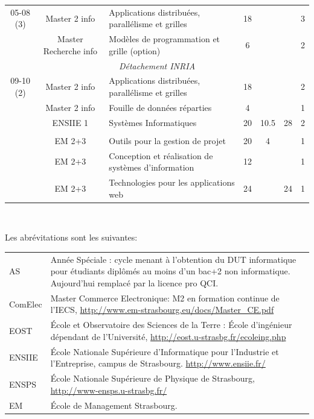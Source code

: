 \documentclass[11pt]{article}
\begin{document}
\begin{center}
{\begin{tabular}{|c|c|p{5cm}|c|c|c|c|}
\hline
05-08 (3)
	& Master 2 info		& Applications distribuées, parallélisme et grilles	&  18	& & & 3 \\
	& Master Recherche info	& Modèles de programmation et grille (option) 		& 6	& & & 2 \\
\hline

\multicolumn{7}{|c|}{\textit{Détachement INRIA}}\\  \hline
09-10 (2)
	& Master 2 info		& Applications distribuées, parallélisme et grilles	&  18	&   &   & 2 \\
	& Master 2 info		& Fouille de données réparties			&  4	&   &   & 1 \\
	& ENSIIE 1		& Systèmes Informatiques				& 20	& 10.5 & 28 & 2 \\ 
&&&&&&\\
	& EM 2+3		& Outils pour la gestion de projet			&  20	& 4 &   & 1 \\
	& EM 2+3		& Conception et réalisation de systèmes d'information	&  12	&   &   & 1 \\
	& EM 2+3		& Technologies pour les applications web		&  24	&   & 24& 1 \\
	
\hline
\end{tabular}\\
}

\end{center}

\noindent
Les abrévitations sont les suivantes:\\

\begin{small}
\begin{tabular}{lp{14cm}}
AS		& Année Spéciale : cycle menant à l'obtention du DUT informatique 
		pour étudiants diplômés au moins d'un bac+2 non informatique. Aujourd'hui remplacé par la licence pro QCI.\\ 
ComElec	& Master Commerce Electronique: M2 en formation continue de l'IECS, \url{http://www.em-strasbourg.eu/docs/Master_CE.pdf}\\
EOST 		& \'Ecole et Observatoire des Sciences de la Terre : \'Ecole d'ingénieur dépendant de l'Université, \url{http://eost.u-strasbg.fr/ecoleing.php}\\
ENSIIE	& \'Ecole Nationale Supérieure d'Informatique pour l'Industrie et l'Entreprise, campus de Strasbourg. \url{http://www.ensiie.fr/}\\
ENSPS		& \'Ecole Nationale Supérieure de Physique de Strasbourg, \url{http://www-ensps.u-strasbg.fr/}\\
EM		& \'Ecole de Management Strasbourg. \\
\end{tabular}
\end{small}
\end{document}
